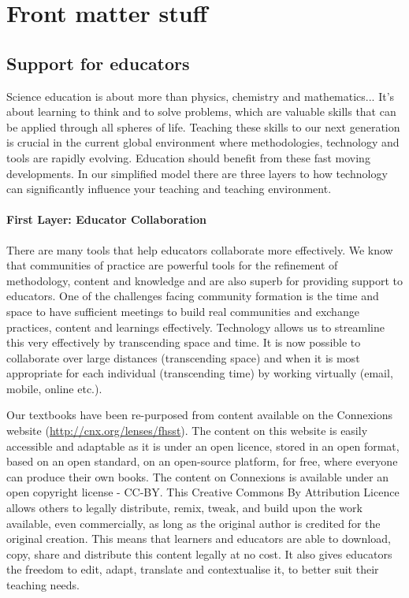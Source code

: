 
\chapter{Front matter stuff}

\section{Support for educators}
Science education is about more than physics, chemistry and mathematics... It's about learning to think and to solve problems, which are valuable skills that can be applied through all spheres of life. Teaching these skills to our next generation is crucial in the current global environment where methodologies, technology and tools are rapidly evolving. Education should benefit from these fast moving developments. In our simplified model there are three layers to how technology can significantly influence your teaching and teaching environment. 

\subsubsection{First Layer: Educator Collaboration}
There are many tools that help educators collaborate more effectively. We know that communities of practice are powerful tools for the refinement of methodology, content and knowledge and are also superb for providing support to educators. One of the challenges facing community formation is the time and space to have sufficient meetings to build real communities and exchange practices, content and learnings effectively. Technology allows us to streamline this very effectively by transcending space and time. It is now possible to collaborate over large distances (transcending space) and when it is most appropriate for each individual (transcending time) by working virtually (email, mobile, online etc.).\par

Our textbooks have been re-purposed from content available on the Connexions website (\url{http://cnx.org/lenses/fhsst}). The content on this website is easily accessible and adaptable  as it is under an open licence, stored in an open format, based on an open standard, on an open-source platform, for free, where everyone can produce their own books. The content on Connexions is available under an open copyright license - CC-BY. This Creative Commons By Attribution Licence allows others to legally distribute, remix, tweak, and build upon the work available, even commercially, as long as the original author is credited for the original creation. This means that learners and educators are able to download, copy, share and distribute this content legally at no cost. It also gives educators the freedom to edit, adapt, translate and contextualise it, to better suit their teaching needs. \par

